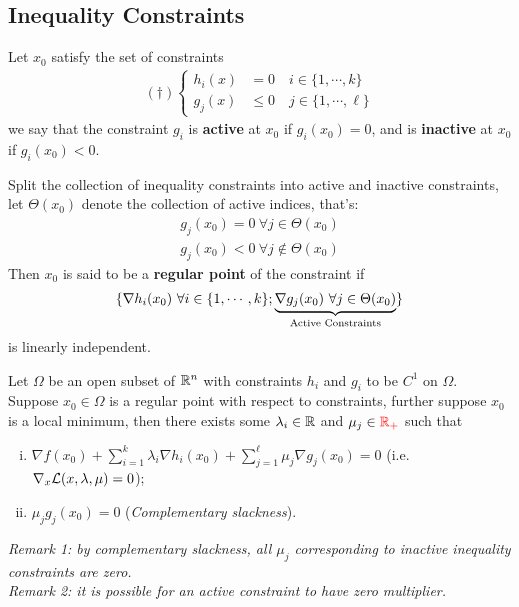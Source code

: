 \documentclass{article}
\begin{document}
   	\subsection{Inequality Constraints}
   	\begin{definition}
   		Let $x_0$ satisfy the set of constraints
   		\begin{align}
   			(\dag)\begin{cases}
	   			h_i(x) &= 0\quad i \in \{1, \cdots, k\} \\
   				g_j(x) &\leq 0\quad j \in \{1, \cdots, \ell\}
   			\end{cases}
   		\end{align}
   		we say that the constraint $g_i$ is \textbf{active} at $x_0$ if $g_i(x_0) = 0$, and is \textbf{inactive} at $x_0$ if $g_i(x_0) < 0$.
   	\end{definition}
   	
   	\begin{definition}
   		Split the collection of inequality constraints into active and inactive constraints, let $\Theta(x_0)$ denote the collection of active indices, that's:
   		\begin{align}
   			g_j (x_0) = 0\ \forall j \in \Theta(x_0) \\
   			g_j (x_0) < 0\ \forall j \notin \Theta(x_0)
   		\end{align}
   		Then $x_0$ is said to be a \textbf{regular point} of the constraint if 
   		\begin{align}
   			\{\nabla h_i(x_0)\ \forall i \in \{1, \cdots, k\}; \underbrace{\nabla g_j(x_0)\ \forall j \in \Theta(x_0)}_{\text{{Active Constraints}}} \}
   		\end{align}
   		is linearly independent. 
   	\end{definition}
   	
   	\begin{theorem}
   		Let $\Omega$ be an open subset of $\mathbb{R}^n$ with constraints $h_i$ and $g_i$ to be $C^1$ on $\Omega$. Suppose $x_0 \in \Omega$ is a regular point with respect to constraints, further suppose $x_0$ is a local minimum, then there exists some $\lambda_i \in \mathbb{R}$ and $\mu_j \in \textcolor{red}{\mathbb{R}_+}$ such that 
   		\begin{enumerate}[(i)]
   			\item $\nabla f(x_0) + \sum_{i=1}^k \lambda_i \nabla h_i(x_0) + \sum_{j=1}^\ell \mu_j \nabla g_j(x_0) = 0$ (i.e. $\nabla_x \mathcal{{L}}(x, \lambda, \mu) = 0$);
   			\item $\mu_j g_j(x_0) = 0$ (\emph{Complementary slackness}).
   		\end{enumerate}
   		\emph{Remark 1: by complementary slackness, all $\mu_j$ corresponding to inactive inequality constraints are zero.} \\
   		\emph{Remark 2: it is possible for an active constraint to have zero multiplier.}
   	\end{theorem}
   	
\end{document}
